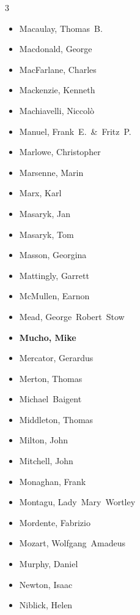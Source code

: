 \documentclass[10pt,makeidx]{extreport}
\begin{document}
\begin{multicols}{3}
\begin{itemize}
		\item Macaulay, Thomas~B.
		\item Macdonald, George
		\item MacFarlane, Charles
		\item Mackenzie, Kenneth
		\item Machiavelli, Niccolò
		\item Manuel, Frank~E.~\&~Fritz~P.
		\item Marlowe, Christopher
		\item Marsenne, Marin
		\item Marx, Karl
		\item Masaryk, Jan
		\item Masaryk, Tom
		\item Masson, Georgina
		\item Mattingly, Garrett
		\item McMullen, Earnon
		\item Mead, George~Robert~Stow
		\item \textbf{Mucho, Mike}
		\item Mercator, Gerardus
		\item Merton, Thomas
		\item Michael~Baigent
		\item Middleton, Thomas
		\item Milton, John
		\item Mitchell, John
		\item Monaghan, Frank
		\item Montagu, Lady~Mary~Wortley
		\item Mordente, Fabrizio
		\item Mozart, Wolfgang~Amadeus
		\item Murphy, Daniel
		\item Newton, Isaac
		\item Niblick, Helen

\end{itemize}
\end{multicols}
\end{document}
